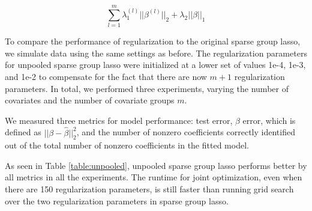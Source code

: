 \documentclass[10pt,letterpaper]{article}
\begin{document}
\begin{equation}
\sum_{l=1}^m \lambda_1^{(l)} \lvert\lvert \beta^{(l)} \rvert \rvert_2
+ \lambda_2 \lvert\lvert \beta \rvert \rvert_1
\end{equation}

To compare the performance of regularization to the original sparse group lasso, we simulate data using the same settings as before. The regularization parameters for unpooled sparse group lasso were initialized at a lower set of values 1e-4, 1e-3, and 1e-2 to compensate for the fact that there are now $m + 1$ regularization parameters. In total, we performed three experiments, varying the number of covariates and the number of covariate groups $m$. 

We measured three metrics for model performance: test error, $\beta$ error, which is defined as $\lvert \lvert \beta - \hat \beta \rvert \rvert_2 ^2$, and the number of nonzero coefficients correctly identified out of the total number of nonzero coefficients in the fitted model.

As seen in Table \ref{table:unpooled}, unpooled sparse group lasso performs better by all metrics in all the experiments. The runtime for joint optimization, even when there are 150 regularization parameters, is still faster than running grid search over the two regularization parameters in sparse group lasso.
\end{document}

